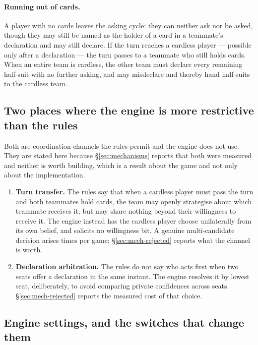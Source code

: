 \paragraph{Running out of cards.} A player with no cards leaves the asking cycle:
they can neither ask nor be asked, though they may still be named as the holder
of a card in a teammate's declaration and may still declare. If the turn reaches
a cardless player --- possible only after a declaration --- the turn passes to a
teammate who still holds cards. When an entire team is cardless, the other team
must declare every remaining half-suit with no further asking, and may misdeclare
and thereby hand half-suits to the cardless team.

\subsection{Two places where the engine is more restrictive than the rules}
\label{sec:rules-gap}

Both are coordination channels the rules permit and the engine does not use.
They are stated here because \S\ref{sec:mechanisms} reports that both were
measured and neither is worth building, which is a result about the game and not
only about the implementation.

\begin{enumerate}
  \item \textbf{Turn transfer.} The rules say that when a cardless player must
        pass the turn and both teammates hold cards, the team may openly
        strategise about which teammate receives it, but may share nothing beyond
        their willingness to receive it. The engine instead has the cardless
        player choose unilaterally from its own belief, and solicits no
        willingness bit. A genuine multi-candidate decision arises
        \numTransferRate{} times per game; \S\ref{sec:mech-rejected} reports what
        the channel is worth.
  \item \textbf{Declaration arbitration.} The rules do not say who acts first
        when two seats offer a declaration in the same instant. The engine
        resolves it by lowest seat, deliberately, to avoid comparing private
        confidences across seats. \S\ref{sec:mech-rejected} reports the measured
        cost of that choice.
\end{enumerate}

\subsection{Engine settings, and the switches that change them}
\label{sec:rules-dialect}

